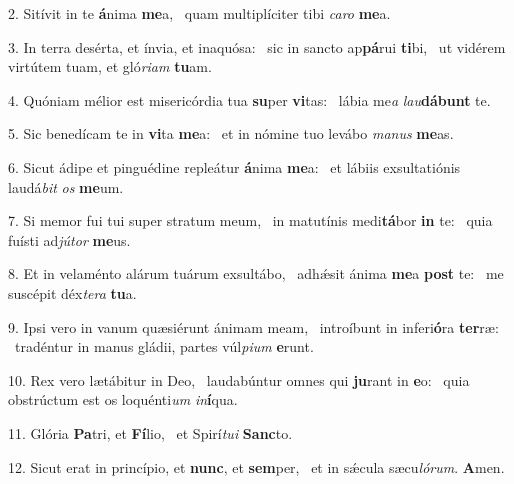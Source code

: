 2. Sitívit in te \textbf{á}nima \textbf{me}a, \ast\  quam multiplíciter tibi \textit{ca}\textit{ro} \textbf{me}a.\

3. In terra desérta, et ínvia, et inaquósa: \dag\  sic in sancto ap\textbf{pá}rui \textbf{ti}bi, \ast\  ut vidérem virtútem tuam, et gló\textit{ri}\textit{am} \textbf{tu}am.\

4. Quóniam mélior est misericórdia tua \textbf{su}per \textbf{vi}tas: \ast\  lábia me\textit{a} \textit{lau}\textbf{dá}\textbf{bunt} te.\

5. Sic benedícam te in \textbf{vi}ta \textbf{me}a: \ast\  et in nómine tuo levábo \textit{ma}\textit{nus} \textbf{me}as.\

6. Sicut ádipe et pinguédine repleátur \textbf{á}nima \textbf{me}a: \ast\  et lábiis exsultatiónis laudá\textit{bit} \textit{os} \textbf{me}um.\

7. Si memor fui tui super stratum meum, \dag\  in matutínis medi\textbf{tá}bor \textbf{in} te: \ast\  quia fuísti ad\textit{jú}\textit{tor} \textbf{me}us.\

8. Et in velaménto alárum tuárum exsultábo, \dag\  adhǽsit ánima \textbf{me}a \textbf{post} te: \ast\  me suscépit déx\textit{te}\textit{ra} \textbf{tu}a.\

9. Ipsi vero in vanum quæsiérunt ánimam meam, \dag\  introíbunt in inferi\textbf{ó}ra \textbf{ter}ræ: \ast\  tradéntur in manus gládii, partes vúl\textit{pi}\textit{um} \textbf{e}runt.\

10. Rex vero lætábitur in Deo, \dag\  laudabúntur omnes qui \textbf{ju}rant in \textbf{e}o: \ast\  quia obstrúctum est os loquénti\textit{um} \textit{in}\textbf{í}qua.\

11. Glória \textbf{Pa}tri, et \textbf{Fí}lio, \ast\  et Spirí\textit{tu}\textit{i} \textbf{Sanc}to.\

12. Sicut erat in princípio, et \textbf{nunc}, et \textbf{sem}per, \ast\  et in sǽcula sæcu\textit{ló}\textit{rum}. \textbf{A}men.\


